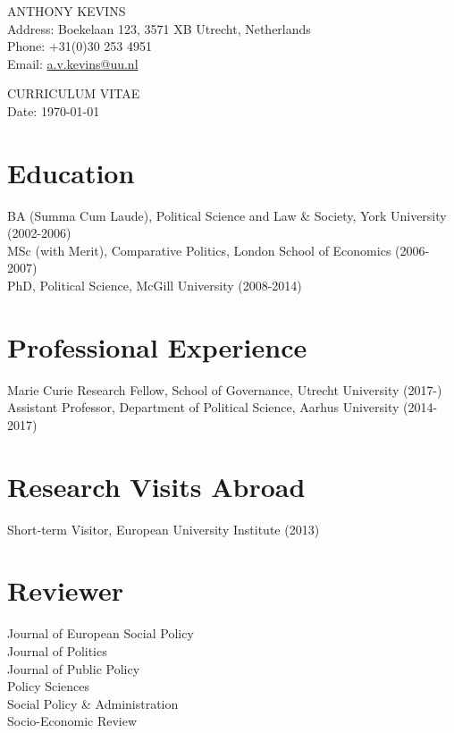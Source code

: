 \documentclass[letterpaper,fontsize=10pt]{scrartcl}
\begin{document}
	\begin{minipage}[t]{0.7\textwidth}
		ANTHONY KEVINS\\
		\normalsize
		Address: Boekelaan 123, 3571 XB Utrecht, Netherlands\\
		Phone: +31(0)30 253 4951\\
		Email: \href{mailto:a.v.kevins@uu.nl}{a.v.kevins@uu.nl}\\
	\end{minipage}
	\begin{minipage}[t]{0.3\textwidth}
		\begin{flushright}
			CURRICULUM VITAE\\
			Date: \today
		\end{flushright}
	\end{minipage}

	\section{Education}
	\vspace{-1em}
	BA (Summa Cum Laude), Political Science and Law \& Society, York University (2002-2006)\\
	MSc (with Merit), Comparative Politics, London School of Economics (2006-2007)\\
	PhD, Political Science, McGill University (2008-2014)

	\section{Professional Experience}
	\vspace{-1em}
	Marie Curie Research Fellow, School of Governance, Utrecht University (2017-)\\
	Assistant Professor, Department of Political Science, Aarhus University (2014-2017)

	\section{Research Visits Abroad}
	\vspace{-1em}
	Short-term Visitor, European University Institute (2013)

	\section{Reviewer}
	\vspace{-1em}
	Journal of European Social Policy\\
	Journal of Politics\\
	Journal of Public Policy\\
	Policy Sciences\\
	Social Policy \& Administration\\
	Socio-Economic Review
\end{document}
